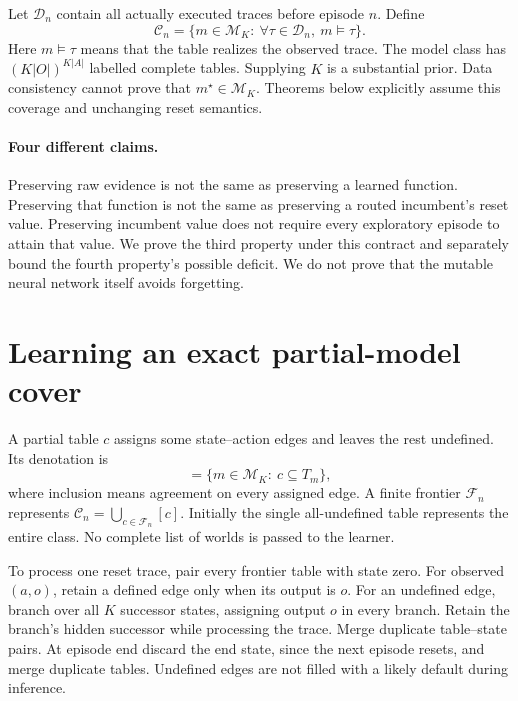 \documentclass[10pt,twocolumn]{article}
\newcommand{\C}{\mathcal C}
\newcommand{\M}{\mathcal M}
\newcommand{\F}{\mathcal F}
\newcommand{\D}{\mathcal D}
\begin{document}
Let $\D_n$ contain all actually executed traces before episode $n$. Define
\begin{equation}
 \C_n=\{m\in\M_K:\ \forall\tau\in\D_n,\ m\models\tau\}.
 \label{eq:class}
\end{equation}
Here $m\models\tau$ means that the table realizes the observed trace.
The model class has $(K|O|)^{K|A|}$ labelled complete tables. Supplying $K$ is a
substantial prior. Data consistency cannot prove that $m^\star\in\M_K$.
Theorems below explicitly assume this coverage and unchanging reset semantics.

\paragraph{Four different claims.}
Preserving raw evidence is not the same as preserving a learned function.
Preserving that function is not the same as preserving a routed incumbent's
reset value. Preserving incumbent value does not require every exploratory
episode to attain that value. We prove the third property under this contract
and separately bound the fourth property's possible deficit. We do not prove
that the mutable neural network itself avoids forgetting.

\section{Learning an exact partial-model cover}
A partial table $c$ assigns some state--action edges and leaves the rest undefined.
Its denotation is
\begin{equation}
 [c]=\{m\in\M_K:\ c\subseteq T_m\},
\end{equation}
where inclusion means agreement on every assigned edge.
A finite frontier $\F_n$ represents $\C_n=\bigcup_{c\in\F_n}[c]$.
Initially the single all-undefined table represents the entire class.
No complete list of worlds is passed to the learner.

To process one reset trace, pair every frontier table with state zero.
For observed $(a,o)$, retain a defined edge only when its output is $o$.
For an undefined edge, branch over all $K$ successor states, assigning output
$o$ in every branch. Retain the branch's hidden successor while processing the
trace. Merge duplicate table--state pairs. At episode end discard the end state,
since the next episode resets, and merge duplicate tables. Undefined edges are
not filled with a likely default during inference.
\end{document}
